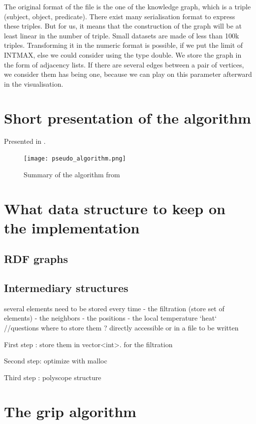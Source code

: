 \documentclass{article}
\begin{document}
The original format of the file is the one of the knowledge graph, which is a triple (subject, object, predicate). There exist many serialisation format to express these triples. But for us, it means that the construction of the graph will be at least linear in the number of triple. Small datasets are made of less than 100k triples. Transforming it in the numeric format is possible, if we put the limit of INT\textunderscore MAX, else we could consider using the type double. We store the graph in the form of adjacency lists. If there are several edges between a pair of vertices, we consider them has being one, because we can play on this parameter afterward in the visualisation. 

 

\section{Short presentation of the algorithm}
Presented in \cite{gajer00}.
\begin{figure}[h!]
    \texttt{[image: pseudo\_algorithm.png]}
    \caption{Summary of the algorithm from \cite{gajer00}}
\end{figure} 

\section{What data structure to keep on the implementation}
\subsection{RDF  graphs}

\subsection{Intermediary structures}
several elements need to be stored every time 
- the filtration (store set of elements)
- the neighbors
- the positions 
- the local temperature `heat` 
//questions where to store them ? directly accessible or in a file to be written

First step : store them in vector<int>. 
    for the filtration

Second step: optimize with malloc

Third step : polyscope structure 



\section{The grip algorithm}
\end{document}
